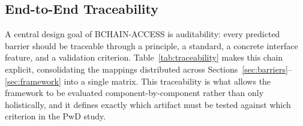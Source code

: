 \documentclass[journal,onecolumn]{IEEEtran}
\begin{document}
\subsection{End-to-End Traceability}
\label{subsec:traceability}

A central design goal of BCHAIN-ACCESS is auditability: every predicted barrier should be traceable through a principle, a standard, a concrete interface feature, and a validation criterion. Table~\ref{tab:traceability} makes this chain explicit, consolidating the mappings distributed across Sections~\ref{sec:barriers}--\ref{sec:framework} into a single matrix. This traceability is what allows the framework to be evaluated component-by-component rather than only holistically, and it defines exactly which artifact must be tested against which criterion in the PwD study.
\end{document}
